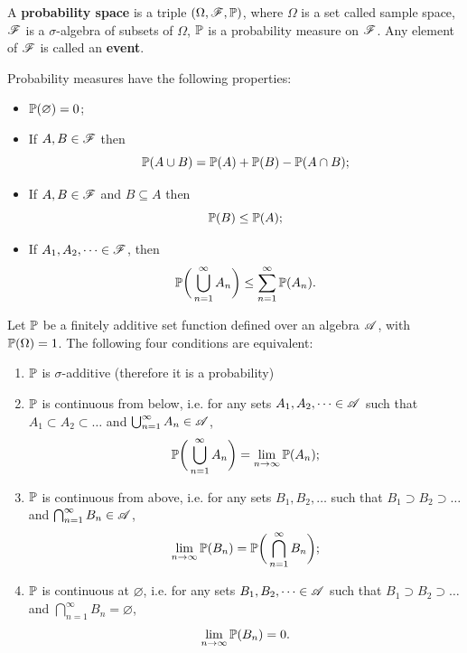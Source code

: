 \begin{definition}
A \textbf{probability space} is a triple $(\Omega ,\mathcal{F}, \mathbb{P})$, where $\Omega$ is a set called sample space, $\mathcal{F}$ is a $\sigma$-algebra of subsets of $\Omega$, $\mathbb{P}$ is a probability measure on $\mathcal{F}$. Any element of $\mathcal{F}$ is called an \textbf{event}.
\end{definition}
\begin{property}
Probability measures have the following properties:
\begin{itemize}
    \item $\mathbb{P}(\varnothing) = 0$;
    \item If $A,B \in \mathcal{F}$ then
    \begin{equation*}
        \mathbb{P}(A\cup B) = \mathbb{P}(A) + \mathbb{P}(B) - \mathbb{P}(A\cap B);
    \end{equation*}
    \item If $A,B \in \mathcal{F}$ and $B\subseteq A$ then
    \begin{equation*}
        \mathbb{P}(B) \le \mathbb{P}(A);
    \end{equation*}
    \item If $A_1, A_2, \dots \in \mathcal{F}$, then 
    \begin{equation*}
        \mathbb{P} \bigg( \bigcup_{n=1}^\infty A_n \bigg) \le \sum_{n=1}^\infty \mathbb{P} (A_n).
    \end{equation*}
\end{itemize}
\end{property}

\begin{proposition}
Let $\mathbb{P}$ be a finitely additive set function defined over an algebra $\mathcal{A}$, with $\mathbb{P}(\Omega) = 1$. The following four conditions are equivalent:
\begin{enumerate}[(1)]
    \item $\mathbb{P}$ is $\sigma$-additive (therefore it is a probability)
    \item $\mathbb{P}$ is continuous from below, i.e. for any sets $A_1, A_2, \dots \in \mathcal{A}$ such that $A_1 \subset A_2 \subset \dots$ and $\bigcup_{n=1}^\infty A_n \in \mathcal{A}$,
    \begin{equation*}
        \mathbb{P} \bigg( \bigcup_{n=1}^\infty A_n \bigg) = \lim_{n \rightarrow \infty} \mathbb{P} (A_n);
    \end{equation*}
    \item $\mathbb{P}$ is continuous from above, i.e. for any sets $B_1, B_2, \dots$ such that $B_1 \supset B_2 \supset \dots$ and $\bigcap_{n=1}^\infty B_n \in \mathcal{A}$,
    \begin{equation*}
        \lim_{n\rightarrow \infty} \mathbb{P}(B_n) = \mathbb{P} \bigg( \bigcap_{n=1}^\infty B_n\bigg);
    \end{equation*}
    \item $\mathbb{P}$ is continuous at $\varnothing$, i.e. for any sets $B_1, B_2, \dots \in \mathcal{A}$ such that $B_1 \supset B_2 \supset \dots$ and $\bigcap_{n=1}^\infty B_n =\varnothing$,
    \begin{equation*}
        \lim_{n \rightarrow \infty} \mathbb{P}(B_n) = 0.
    \end{equation*}
\end{enumerate}
\end{proposition}

